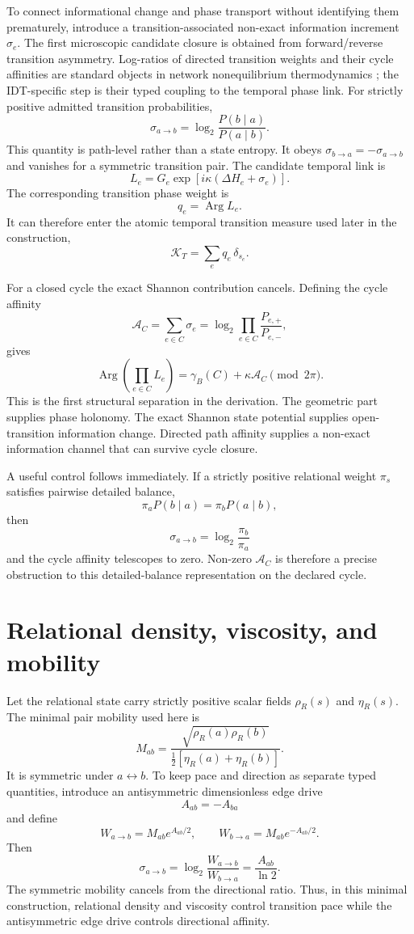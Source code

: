 \documentclass[11pt]{book}
\begin{document}
To connect informational change and phase transport without identifying them prematurely, introduce a transition-associated non-exact information increment $\sigma_e$. The first microscopic candidate closure is obtained from forward/reverse transition asymmetry. Log-ratios of directed transition weights and their cycle affinities are standard objects in network nonequilibrium thermodynamics \cite{Schnakenberg1976}; the IDT-specific step is their typed coupling to the temporal phase link. For strictly positive admitted transition probabilities,
\[
\boxed{
\sigma_{a\to b}
=
\log_2\frac{P(b\mid a)}{P(a\mid b)}.
}
\]
This quantity is path-level rather than a state entropy. It obeys $\sigma_{b\to a}=-\sigma_{a\to b}$ and vanishes for a symmetric transition pair. The candidate temporal link is
\[
\boxed{
L_e
=
G_e\exp\!\left[i\kappa\left(\Delta H_e+\sigma_e\right)\right].
}
\]
The corresponding transition phase weight is
\[
q_e=\operatorname{Arg}L_e.
\]
It can therefore enter the atomic temporal transition measure used later in the construction,
\[
\mathcal K_T=\sum_e q_e\,\delta_{s_e}.
\]

For a closed cycle the exact Shannon contribution cancels. Defining the cycle affinity
\[
\mathcal A_C
=
\sum_{e\in C}\sigma_e
=
\log_2\prod_{e\in C}
\frac{P_{e,+}}{P_{e,-}},
\]
gives
\[
\boxed{
\operatorname{Arg}\!\left(\prod_{e\in C}L_e\right)
=
\gamma_B(C)
+
\kappa\mathcal A_C
\pmod{2\pi}.
}
\]
This is the first structural separation in the derivation. The geometric part supplies phase holonomy. The exact Shannon state potential supplies open-transition information change. Directed path affinity supplies a non-exact information channel that can survive cycle closure.

A useful control follows immediately. If a strictly positive relational weight $\pi_s$ satisfies pairwise detailed balance,
\[
\pi_aP(b\mid a)=\pi_bP(a\mid b),
\]
then
\[
\sigma_{a\to b}=\log_2\frac{\pi_b}{\pi_a}
\]
and the cycle affinity telescopes to zero. Non-zero $\mathcal A_C$ is therefore a precise obstruction to this detailed-balance representation on the declared cycle.

\section{Relational density, viscosity, and mobility}

Let the relational state carry strictly positive scalar fields $\rho_R(s)$ and $\eta_R(s)$. The minimal pair mobility used here is
\[
\boxed{
M_{ab}
=
\frac{\sqrt{\rho_R(a)\rho_R(b)}}
{\tfrac12[\eta_R(a)+\eta_R(b)]}.
}
\]
It is symmetric under $a\leftrightarrow b$. To keep pace and direction as separate typed quantities, introduce an antisymmetric dimensionless edge drive
\[
A_{ab}=-A_{ba}
\]
and define
\[
\boxed{
W_{a\to b}=M_{ab}e^{A_{ab}/2},
\qquad
W_{b\to a}=M_{ab}e^{-A_{ab}/2}.
}
\]
Then
\[
\sigma_{a\to b}
=
\log_2\frac{W_{a\to b}}{W_{b\to a}}
=
\frac{A_{ab}}{\ln2}.
\]
The symmetric mobility cancels from the directional ratio. Thus, in this minimal construction, relational density and viscosity control transition pace while the antisymmetric edge drive controls directional affinity.
\end{document}
